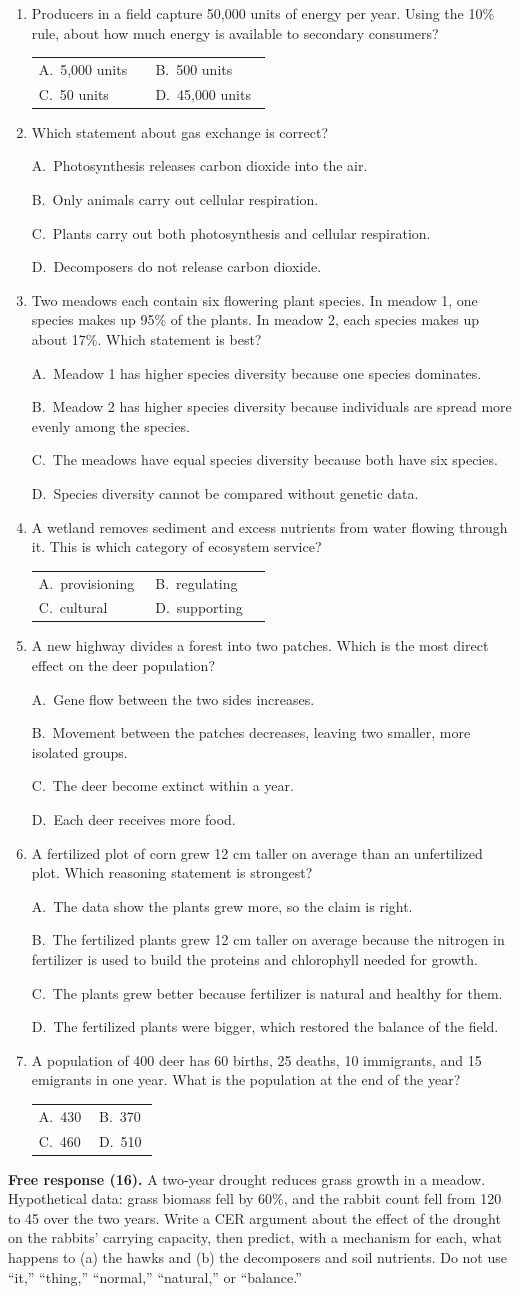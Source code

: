\documentclass[11pt,letterpaper]{article}
\makeatletter
\newcommand{\mc}[5]{\item #1\par\smallskip\begin{tabularx}{\linewidth}{@{}p{0.47\linewidth}p{0.47\linewidth}@{}}A.\ #2 & B.\ #3\\ C.\ #4 & D.\ #5\end{tabularx}\par}
\newcommand{\mcl}[5]{\item #1\par\smallskip A.\ #2\par B.\ #3\par C.\ #4\par D.\ #5\par}
\makeatother
\begin{document}
\begin{enumerate}[itemsep=4pt]
\mc{Producers in a field capture 50{,}000 units of energy per year. Using the 10\% rule, about how much energy is available to secondary consumers?}{5{,}000 units}{500 units}{50 units}{45{,}000 units}
\mcl{Which statement about gas exchange is correct?}{Photosynthesis releases carbon dioxide into the air.}{Only animals carry out cellular respiration.}{Plants carry out both photosynthesis and cellular respiration.}{Decomposers do not release carbon dioxide.}
\mcl{Two meadows each contain six flowering plant species. In meadow 1, one species makes up 95\% of the plants. In meadow 2, each species makes up about 17\%. Which statement is best?}{Meadow 1 has higher species diversity because one species dominates.}{Meadow 2 has higher species diversity because individuals are spread more evenly among the species.}{The meadows have equal species diversity because both have six species.}{Species diversity cannot be compared without genetic data.}
\mc{A wetland removes sediment and excess nutrients from water flowing through it. This is which category of ecosystem service?}{provisioning}{regulating}{cultural}{supporting}
\mcl{A new highway divides a forest into two patches. Which is the most direct effect on the deer population?}{Gene flow between the two sides increases.}{Movement between the patches decreases, leaving two smaller, more isolated groups.}{The deer become extinct within a year.}{Each deer receives more food.}
\mcl{A fertilized plot of corn grew 12 cm taller on average than an unfertilized plot. Which reasoning statement is strongest?}{The data show the plants grew more, so the claim is right.}{The fertilized plants grew 12 cm taller on average because the nitrogen in fertilizer is used to build the proteins and chlorophyll needed for growth.}{The plants grew better because fertilizer is natural and healthy for them.}{The fertilized plants were bigger, which restored the balance of the field.}
\mc{A population of 400 deer has 60 births, 25 deaths, 10 immigrants, and 15 emigrants in one year. What is the population at the end of the year?}{430}{370}{460}{510}
\end{enumerate}
\textbf{Free response (16).} A two-year drought reduces grass growth in a meadow. Hypothetical data: grass biomass fell by 60\%, and the rabbit count fell from 120 to 45 over the two years. Write a CER argument about the effect of the drought on the rabbits' carrying capacity, then predict, with a mechanism for each, what happens to (a) the hawks and (b) the decomposers and soil nutrients. Do not use ``it,'' ``thing,'' ``normal,'' ``natural,'' or ``balance.''
\end{document}
